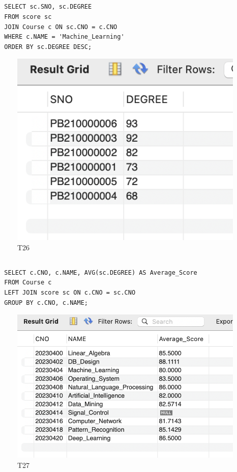 \documentclass[UTF8]{ctexart}
\begin{document}
\subsection{}
\begin{lstlisting}
  SELECT sc.SNO, sc.DEGREE
  FROM score sc
  JOIN Course c ON sc.CNO = c.CNO
  WHERE c.NAME = 'Machine_Learning'
  ORDER BY sc.DEGREE DESC;
\end{lstlisting}
\begin{figure}[H]
  \centering
  \includegraphics[scale=0.7]{pics/26.png}
  \caption*{T26}
\end{figure}

\subsection{}
\begin{lstlisting}
  SELECT c.CNO, c.NAME, AVG(sc.DEGREE) AS Average_Score
  FROM Course c
  LEFT JOIN score sc ON c.CNO = sc.CNO
  GROUP BY c.CNO, c.NAME;  
\end{lstlisting}
\begin{figure}[H]
  \centering
  \includegraphics[scale=0.7]{pics/27.png}
  \caption*{T27}
\end{figure}
\end{document}
